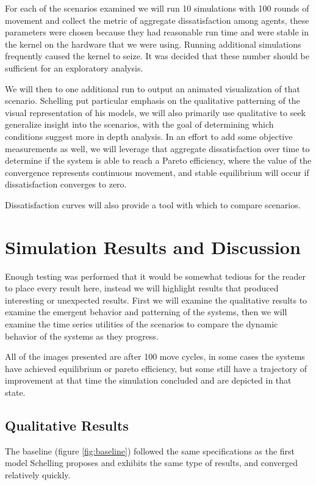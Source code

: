 \documentclass[sigplan,nonacm]{acmart}
\begin{document}
For each of the scenarios examined we will run 10 simulations with 100 rounds of movement and collect the metric
of aggregate dissatisfaction among agents, these parameters were chosen because they had reasonable run time
and were stable in the kernel on the hardware that we were using. 
Running additional simulations frequently caused the kernel to seize.
It was decided that these number should be sufficient for an exploratory analysis.

We will then to one additional run to output an animated visualization of that scenario.
Schelling put particular emphasis on the qualitative patterning of the visual representation of his models,
we will also primarily use qualitative to seek generalize insight into the scenarios, with the goal of 
determining which conditions suggest more in depth analysis.
In an effort to add some objective measurements as well, we will leverage that aggregate dissatisfaction over time
to determine if the system is able to reach a Pareto efficiency, where the value of the convergence represents
continuous movement, and stable equilibrium will occur if dissatisfaction converges to zero.

Dissatisfaction curves will also provide a tool with which to compare scenarios.

\section{Simulation Results and Discussion}

Enough testing was performed that it would be somewhat tedious for the reader to place every result here,
instead we will highlight results that produced interesting or unexpected results.
First we will examine the qualitative results to examine the emergent behavior and patterning of the systems,
then we will examine the time series utilities of the scenarios to compare the dynamic behavior of the systems as they progress.

All of the images presented are after 100 move cycles, in some cases the systems have achieved equilibrium or pareto efficiency,
but some still have a trajectory of improvement at that time the simulation concluded and are depicted in that state.

\subsection{Qualitative Results}

The baseline (figure \ref{fig:baseline}) followed the same specifications as the first model Schelling proposes and exhibits the same type of results,
and converged relatively quickly.
\end{document}
